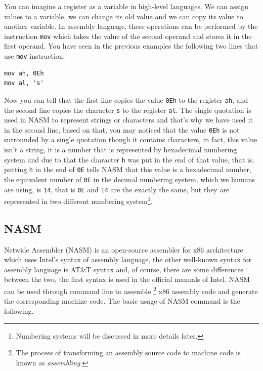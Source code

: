 You can imagine a register as a variable in high-level languages. We can
assign values to a variable, we can change its old value and we can copy
its value to another variable. In assembly language, these operations
can be performed by the instruction \lstinline!mov! which takes the
value of the second operand and stores it in the first operand. You have
seen in the previous examples the following two lines that use
\lstinline!mov! instruction.

\begin{lstlisting}
mov ah, 0Eh
mov al, 's' 
\end{lstlisting}

Now you can tell that the first line copies the value \lstinline!0Eh! to
the register \lstinline!ah!, and the second line copies the character
\lstinline!s! to the register \lstinline!al!. The single quotation is
used in NASM to represent strings or characters and that's why we have
used it in the second line, based on that, you may noticed that the
value \lstinline!0Eh! is not surrounded by a single quotation though it
contains characters, in fact, this value isn't a string, it is a number
that is represented by hexadecimal numbering system and due to that the
character \lstinline!h! was put in the end of that value, that is,
putting \lstinline!h! in the end of \lstinline!0E! tells NASM that this
value is a hexadecimal number, the equivalent number of \lstinline!0E!
in the decimal numbering system, which we humans are using, is
\lstinline!14!, that is \lstinline!0E! and \lstinline!14! are the
exactly the same, but they are represented in two different numbering
system\footnote{Numbering systems will be discussed in more details
  later.}.

\subsection{NASM}\label{nasm}

Netwide Assembler (NASM) is an open-source assembler for x86
architecture which uses Intel's syntax of assembly language, the other
well-known syntax for assembly language is AT\&T syntax and, of course,
there are some differences between the two, the first syntax is used in
the official manuals of Intel. NASM can be used through command line to
assemble \footnote{The process of transforming an assembly source code
  to machine code is known as \emph{assembling}.} x86 assembly code and
generate the corresponding machine code. The basic usage of NASM command
is the following.

